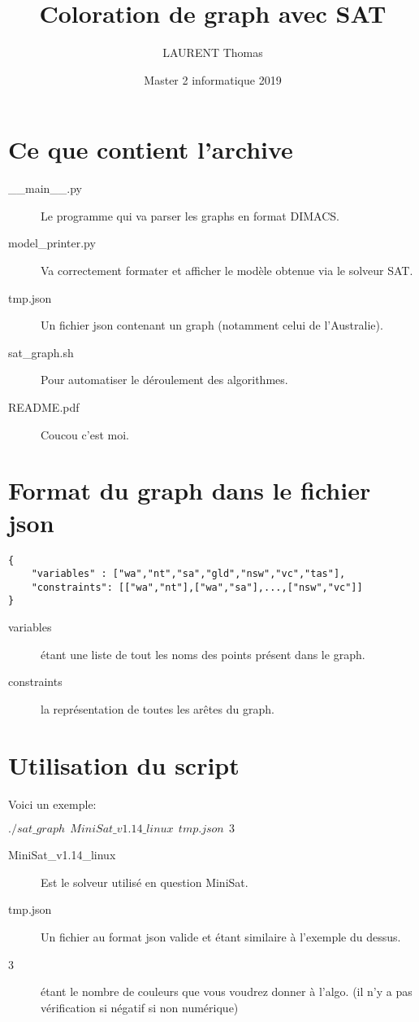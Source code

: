 \documentclass[french, 12pt]{report}
\title{Coloration de graph avec SAT}
\author{LAURENT Thomas}
\date{Master 2 informatique 2019}
\newcommand{\formula}[1]{
\begin{center}
{#1}
\end{center}
}
\begin{document}
\maketitle
\pagebreak

\section{Ce que contient l'archive}

\begin{description}
\item[\_\_main\_\_.py] Le programme qui va parser les graphs en format DIMACS.
\item[model\_printer.py] Va correctement formater et afficher le modèle obtenue via le solveur SAT.
\item[tmp.json] Un fichier json contenant un graph (notamment celui de l'Australie).
\item[sat\_graph.sh] Pour automatiser le déroulement des algorithmes.
\item[README.pdf] Coucou c'est moi.
\end{description}

\section{Format du graph dans le fichier json}

\lstset{style=myjson}
\begin{lstlisting}
{
    "variables" : ["wa","nt","sa","gld","nsw","vc","tas"],
    "constraints": [["wa","nt"],["wa","sa"],...,["nsw","vc"]]
}
\end{lstlisting}

\begin{description}
\item[variables] étant une liste de tout les noms des points présent dans le graph.
\item[constraints] la représentation de toutes les arêtes du graph.
\end{description}

\pagebreak
\section{Utilisation du script}
Voici un exemple:
\formula{$./sat\_graph\ \ MiniSat\_v1.14\_linux\ \ tmp.json\ \ 3$}

\begin{description}
\item[MiniSat\_v1.14\_linux] Est le solveur utilisé en question MiniSat.
\item[tmp.json] Un fichier au format json valide et étant similaire à l'exemple du dessus.
\item[3] étant le nombre de couleurs que vous voudrez donner à l'algo. (il n'y a pas vérification si négatif si non numérique)
\end{description}
\end{document}
